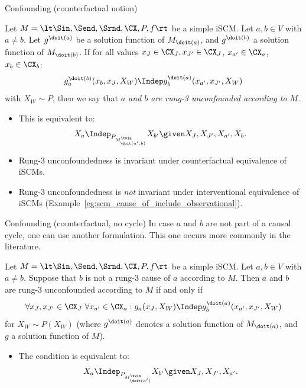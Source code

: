 \begin{frame}{Confounding (counterfactual notion)}
  
\begin{Def}[\ref{def:scm_rung3_unconfounded}]
  Let $M = \lt \Sin, \Send, \Srnd, \CX, P, f \rt$ be a simple iSCM.
  Let $a, b \in V$ with $a \ne b$.
  Let $g^{\doit(a)}$ be a solution function of $M_{\doit(a)}$, and $g^{\doit(b)}$ a solution function of $M_{\doit(b)}$.
  If for all values $x_J \in \CX_J, x_{J'} \in \CX_J$, $x_{a'} \in \CX_a$, $x_b \in \CX_b$: 
  $$g^{\doit(b)}_a(x_b,x_J,X_W) \Indep g^{\doit(a)}_b(x_{a'},x_{J'},X_W)$$
  with $X_W \sim P$, then we say that \emph{$a$ and $b$ are rung-3 unconfounded according to $M$}.
\end{Def}

  \begin{itemize}
    \item This is equivalent to:
      $$X_a \Indep_{P_{M^\twin_{\doit(a',b)}}} X_{b'} \given X_J, X_{J'}, X_{a'}, X_b.$$
    \item Rung-3 unconfoundedness is invariant under counterfactual equivalence of iSCMs.
    \item Rung-3 unconfoundedness is \emph{not} invariant under interventional equivalence of iSCMs (Example~\ref{eg:scm_cause_of_include_observational}).
  \end{itemize}
\end{frame}

\begin{frame}{Confounding (counterfactual, no cycle)}
  In case $a$ and $b$ are not part of a causal cycle, one can use another formulation. This one occurs more commonly in the literature.
  \begin{Prp}[\ref{prp:scm_rung3_unconfounded_acyclic}]
  Let $M = \lt \Sin, \Send, \Srnd, \CX, P, f \rt$ be a simple iSCM.
  Let $a, b \in V$ with $a \ne b$.
  Suppose that $b$ is not a rung-3 cause of $a$ according to $M$.
  Then $a$ and $b$ are rung-3 unconfounded according to $M$ if and only if
  \begin{equation*}
    \forall x_J,x_{J'} \in \CX_J \ \forall x_{a'} \in \CX_a: g_a(x_J,X_W) \Indep g^{\doit(a)}_b(x_{a'},x_{J'},X_W)
  \end{equation*}
  for $X_W \sim P(X_W)$ (where $g^{\doit(a)}$ denotes a solution function of $M_{\doit(a)}$, and $g$ a solution function of $M$).
\end{Prp}
  \begin{itemize}
    \item The condition is equivalent to:
      $$X_a \Indep_{P_{M^\twin_{\doit(a')}}} X_{b'} \given X_J, X_{J'}, X_{a'}.$$
  \end{itemize}
\end{frame}

